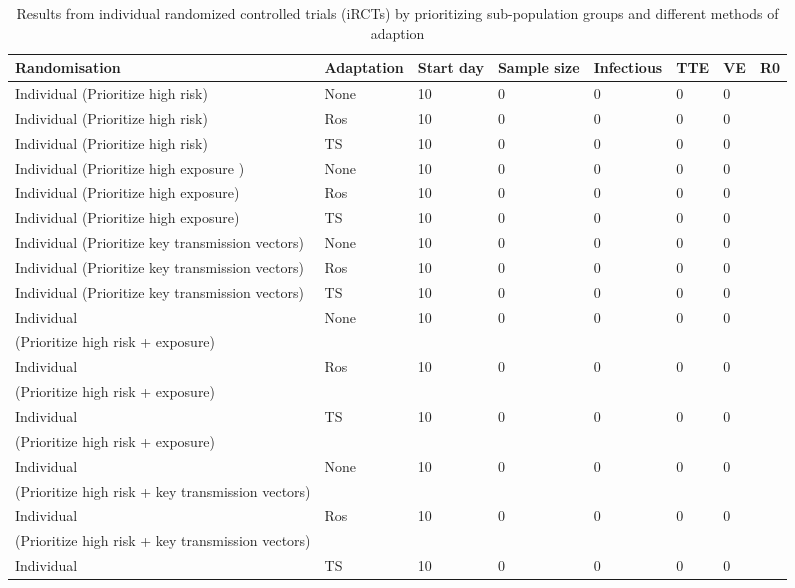\documentclass[a4paper]{article}
\begin{document}
\begin{landscape}
		\begin{table}[]
			\centering
			\caption{Results from individual randomized controlled trials (iRCTs) by prioritizing sub-population groups and different methods of adaption}
			\label{iRCTs_with_priority}
			\begin{tabular}{|l|l|l|l|l|l|l|l|} \hline
				Randomisation & Adaptation & Start day & Sample size & Infectious & TTE & VE & R0\\ \hline \hline
				Individual (Prioritize high risk) & None & 10 & 0 & 0 & 0 & 0 & \\
				Individual (Prioritize high risk) & Ros & 10 & 0 & 0 & 0 & 0 & \\
				Individual (Prioritize high risk) & TS & 10 & 0 & 0 & 0 & 0 & \\
				Individual (Prioritize high exposure ) & None & 10 & 0 & 0 & 0 & 0 & \\
				Individual (Prioritize high exposure) & Ros & 10 & 0 & 0 & 0 & 0  & \\
				Individual (Prioritize high exposure) & TS & 10 & 0 & 0 & 0 & 0 & \\
				Individual (Prioritize key transmission vectors) & None & 10 & 0 & 0 & 0 & 0  & \\
				Individual (Prioritize key transmission vectors) & Ros & 10 & 0 & 0 & 0 & 0  & \\
				Individual (Prioritize key transmission vectors) & TS & 10 & 0 & 0 & 0 & 0  & \\
				\hline 
				Individual & None & 10 & 0 & 0 & 0 & 0  & \\
				(Prioritize high risk + exposure) &  &  &  &  &  &  & \\
				Individual & Ros & 10 & 0 & 0 & 0 & 0  & \\
				(Prioritize high risk + exposure) &  &  &  &  &  &  & \\
				Individual & TS & 10 & 0 & 0 & 0 & 0  & \\
				(Prioritize high risk + exposure) &  &  &  &  &  &  & \\
				Individual & None & 10 & 0 & 0 & 0 & 0  & \\
				(Prioritize high risk + key transmission vectors) &  &  &  &  &  &  & \\
				Individual & Ros & 10 & 0 & 0 & 0 & 0  & \\
				(Prioritize high risk + key transmission vectors) &  &  &  &  &  &  & \\
				Individual & TS & 10 & 0 & 0 & 0 & 0  & \\

\end{tabular}
\end{table}
\end{landscape}
\end{document}
